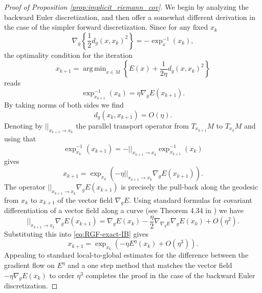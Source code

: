 \documentclass[reqno,11pt,letterpaper]{amsart}
\theoremstyle{plain}
\theoremstyle{definition}
\theoremstyle{remark}
\DeclareMathOperator*{\argmin}{arg\,min}
\newcommand{\gives}{\rightarrow}
\newcommand{\lr}[1]{\left(#1\right)}
\newcommand{\set}[1]{\left\{#1\right\}}
\begin{document}
\begin{proof}[Proof of Proposition \ref{prop:implicit_riemann_cov}]
    We begin by analyzing the backward Euler discretization, and then offer a somewhat different derivation in the case of the  simpler forward discretization. Since for any fixed $x_k$ 
    \[
        \nabla_g \set{\frac{1}{2} d_g(x,x_k)^2 }= - \exp_x^{-1}(x_k), 
    \]
    the optimality condition for the iteration
    \[
         x_{k+1}=\argmin_{x\in M} \set{E(x) + \frac{1}{2\eta}d_g(x,x_k)^2}
    \]
    reads
    \[
         \exp_{x_{k+1}}^{-1}(x_k) = \eta \nabla_g E(x_{k+1}). 
    \]
    By taking norms of both sides we find
    \[
    d_g(x_k, x_{k+1}) = O(\eta).
    \]
    Denoting by $||_{x_{k+1}\gives x_k}$ the parallel transport operator from $T_{x_{k+1}}M$ to $T_{x_k}M$ and using that 
    \[
    \exp_{x_k}^{-1}(x_{k+1}) = -||_{x_{k+1}\gives x_k} \exp_{x_{k+1}}^{-1}(x_k) 
    \]
    gives
    \begin{equation}\label{eq:RGF-exact-IB}
        x_{k+1}=\exp_{x_k}\lr{ -\eta ||_{x_{k+1}\gives x_k} \nabla_g E(x_{k+1})}.
    \end{equation}
    The operator $||_{x_{k+1}\gives x_k} \nabla_g E(x_{k+1})$ is precisely the pull-back along the geodesic from $x_{k}$ to $x_{k+1}$ of the vector field $\nabla_g E$. Using standard formulas for covariant differentiation of a vector field along a curve (see Theorem 4.34 in \cite{lee2018introduction}) we have 
    \[
    ||_{x_{k+1}\gives x_k} \nabla_g E(x_{k+1}) = \nabla_g E(x_k) - \frac{\eta}{2}\nabla_{\nabla_g E} \nabla_g E(x_k) + O(\eta^2).
    \]
    Substituting this into \eqref{eq:RGF-exact-IB} gives
    \[
    x_{k+1} = \exp_{x_k} \lr{-\eta E^\eta(x_k) + O(\eta^3)}.
    \]
    Appealing to standard local-to-global estimates \cite[Theorem 3.2 II.3]{hairer2003geometric} for the difference between the gradient flow on $E^\eta$ and a one step method that matches the vector field $-\eta \nabla_g E(x_k)$ to order $\eta^3$ completes the proof in the case of the backward Euler discretization. 
    

\end{proof}
\end{document}
